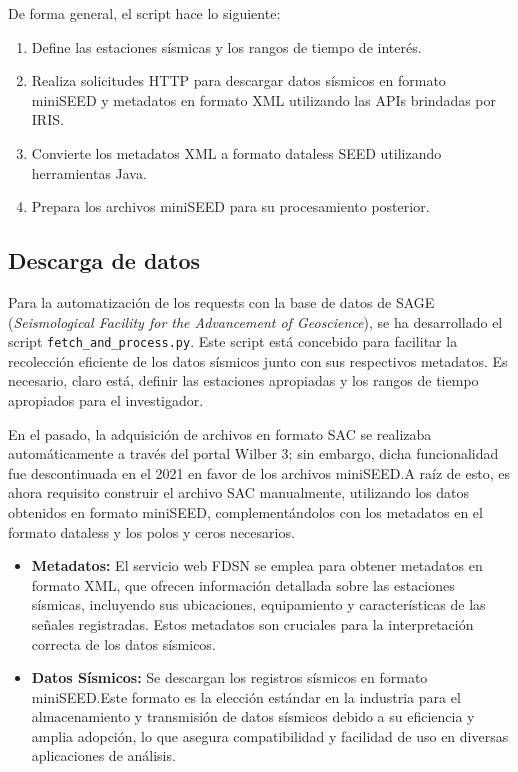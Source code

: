 \documentclass[a4paper,11pt]{refart}
\begin{document}
De forma general, el script hace lo siguiente:

\begin{enumerate}
  \item Define las estaciones sísmicas y los rangos de tiempo de interés.
  \item Realiza solicitudes HTTP para descargar datos sísmicos en formato miniSEED y metadatos en formato XML utilizando las APIs brindadas por IRIS.\@
  \item Convierte los metadatos XML a formato dataless SEED utilizando herramientas Java.
  \item Prepara los archivos miniSEED para su procesamiento posterior.
\end{enumerate}

\subsection{Descarga de datos}

Para la automatización de los requests con la base de datos de SAGE (\textit{Seismological Facility for the Advancement of Geoscience}), se ha desarrollado el script \texttt{fetch\_and\_process.py}. Este script está concebido para facilitar la recolección eficiente de los datos sísmicos junto con sus respectivos metadatos. Es necesario, claro está, definir las estaciones apropiadas y los rangos de tiempo apropiados para el investigador.

En el pasado, la adquisición de archivos en formato SAC se realizaba automáticamente a través del portal Wilber 3; sin embargo, dicha funcionalidad fue descontinuada en el 2021 en favor de los archivos miniSEED.\@ A raíz de esto, es ahora requisito construir el archivo SAC manualmente, utilizando los datos obtenidos en formato miniSEED, complementándolos con los metadatos en el formato dataless y los polos y ceros necesarios.

\begin{itemize}
    \item \textbf{Metadatos:} El servicio web FDSN se emplea para obtener metadatos en formato XML, que ofrecen información detallada sobre las estaciones sísmicas, incluyendo sus ubicaciones, equipamiento y características de las señales registradas. Estos metadatos son cruciales para la interpretación correcta de los datos sísmicos.
    \item \textbf{Datos Sísmicos:} Se descargan los registros sísmicos en formato miniSEED.\@ Este formato es la elección estándar en la industria para el almacenamiento y transmisión de datos sísmicos debido a su eficiencia y amplia adopción, lo que asegura compatibilidad y facilidad de uso en diversas aplicaciones de análisis.
\end{itemize}
\end{document}
